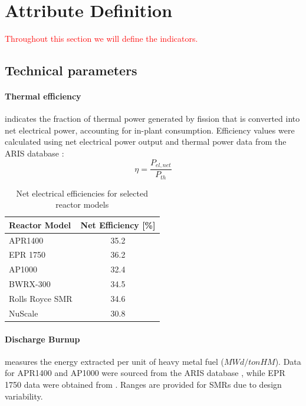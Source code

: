 \section{Attribute Definition}
\textcolor{red}{Throughout this section we will define the indicators.}

\subsection{Technical parameters}

\paragraph{Thermal efficiency} indicates the fraction of thermal power generated by fission that is converted into net electrical power, accounting for in-plant consumption. Efficiency values were calculated using net electrical power output and thermal power data from the ARIS database \cite{iaea2025aris}:
$$
\eta = \frac{P_{el,net}}{P_{th}}
$$

\begin{table}[!ht]
    \centering
    \begin{tabularx}{\textwidth}{X c}
        \toprule
        \textbf{Reactor Model} & \textbf{Net Efficiency [\%]} \\
        \midrule
        APR1400         & 35.2 \\
        EPR 1750        & 36.2 \\
        AP1000          & 32.4 \\
        BWRX-300        & 34.5 \\
        Rolls Royce SMR & 34.6 \\
        NuScale         & 30.8 \\
        \bottomrule
    \end{tabularx}
    \caption{Net electrical efficiencies for selected reactor models}
    \label{tab:reactor-efficiency}
\end{table}


\paragraph{Discharge Burnup} measures the energy extracted per unit of heavy metal fuel ($MWd/tonHM$). Data for APR1400 and AP1000 were sourced from the ARIS database \cite{iaea2025aris}, while EPR 1750 data were obtained from \cite{NRC_ML052280170}. Ranges are provided for SMRs due to design variability.

